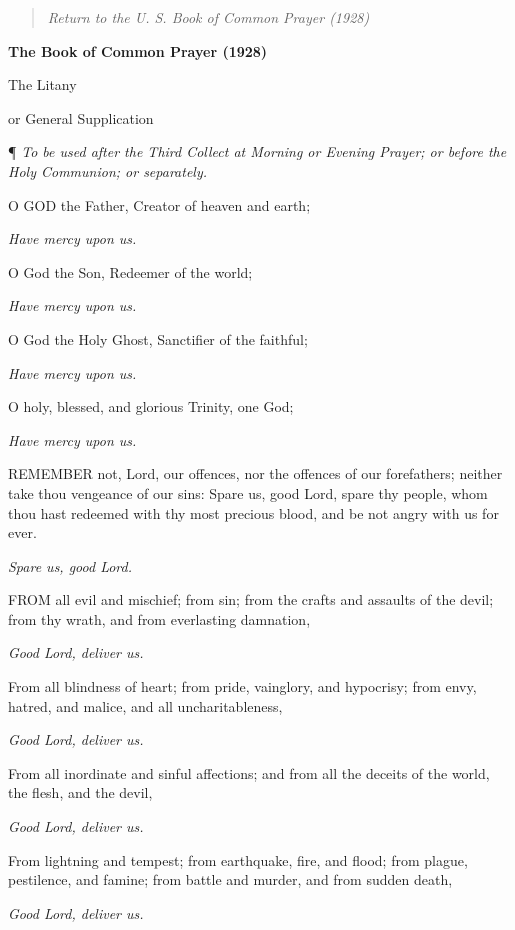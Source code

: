 \begin{quote}

\emph{Return to the U.
S. Book of Common Prayer (1928)}

\end{quote}


\textbf{The Book of Common Prayer (1928)}

The
Litany

or General
Supplication

¶
\emph{To be used after the Third Collect at Morning or Evening Prayer; or
before the Holy Communion; or separately.}

O
GOD the Father, Creator of heaven and earth; 

\emph{Have mercy upon us.}

O God the Son, Redeemer of the world; 

\emph{Have mercy upon us.}

O God the Holy Ghost, Sanctifier of the faithful; 

\emph{Have mercy upon us.}

O holy, blessed, and glorious Trinity, one God; 

\emph{Have mercy upon us.}

REMEMBER
not, Lord, our offences, nor the offences of our forefathers; neither
take thou vengeance of our sins: Spare us, good Lord, spare thy people,
whom thou hast redeemed with thy most precious blood, and be not angry
with us for ever. 

\emph{Spare us, good Lord.}

FROM
all evil and mischief; from sin; from the crafts and assaults of the devil;
from thy wrath, and from everlasting damnation,

\emph{Good Lord, deliver us.}

From all blindness of heart; from pride, vainglory,
and hypocrisy; from envy, hatred, and malice, and all uncharitableness,

\emph{Good Lord, deliver us.}

From all inordinate and sinful affections; and from
all the deceits of the world, the flesh, and the devil, 

\emph{Good Lord, deliver us.}

From lightning and tempest; from earthquake, fire,
and flood; from plague, pestilence, and famine; from battle and murder,
and from sudden death, 

\emph{Good Lord, deliver us.}

